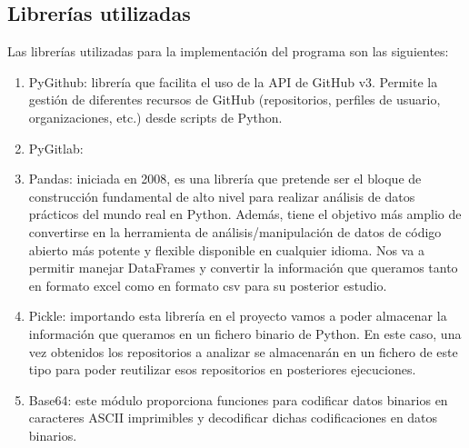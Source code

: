 \subsection{Librerías utilizadas}
Las librerías utilizadas para la implementación del programa son las siguientes:
\begin{enumerate}
    \item PyGithub: librería que facilita el uso de la API de GitHub v3. Permite la gestión de diferentes recursos de GitHub (repositorios, perfiles de usuario, organizaciones, etc.) desde scripts de Python.
    \item PyGitlab:
    \item Pandas: iniciada en 2008, es una librería que pretende ser el bloque de construcción fundamental de alto nivel para realizar análisis de datos prácticos del mundo real en Python. Además, tiene el objetivo más amplio de convertirse en la herramienta de análisis/manipulación de datos de código abierto más potente y flexible disponible en cualquier idioma. Nos va a permitir manejar DataFrames y convertir la información que queramos tanto en formato excel como en formato csv para su posterior estudio.
    \item Pickle: importando esta librería en el proyecto vamos a poder almacenar la información que queramos en un fichero binario de Python. En este caso, una vez obtenidos los repositorios a analizar se almacenarán en un fichero de este tipo para poder reutilizar esos repositorios en posteriores ejecuciones.
    \item Base64: este módulo proporciona funciones para codificar datos binarios en caracteres ASCII imprimibles y decodificar dichas codificaciones en datos binarios.
\end{enumerate}

